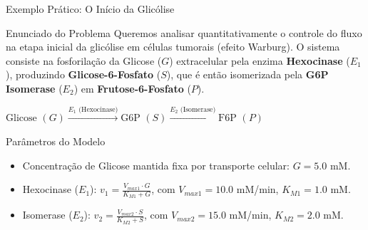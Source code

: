 \begin{frame}[shrink=10]{Exemplo Prático: O Início da Glicólise}
\begin{block}{Enunciado do Problema}
Queremos analisar quantitativamente o controle do fluxo na etapa inicial da glicólise em células tumorais (efeito Warburg). O sistema consiste na fosforilação da Glicose ($G$) extracelular pela enzima \textbf{Hexocinase} ($E_1$), produzindo \textbf{Glicose-6-Fosfato} ($S$), que é então isomerizada pela \textbf{G6P Isomerase} ($E_2$) em \textbf{Frutose-6-Fosfato} ($P$).
\end{block}

\vspace{0.1cm}
\begin{center}
$\text{Glicose } (G) \xrightarrow{E_1 \text{ (Hexocinase)}} \text{G6P } (S) \xrightarrow{E_2 \text{ (Isomerase)}} \text{F6P } (P)$
\end{center}
\vspace{0.1cm}

\begin{block}{Parâmetros do Modelo}
\begin{itemize}
    \item Concentração de Glicose mantida fixa por transporte celular: $G = 5.0$ mM.
    \item Hexocinase ($E_1$): $v_1 = \frac{V_{max1} \cdot G}{K_{M1} + G}$, com $V_{max1} = 10.0$ mM/min, $K_{M1} = 1.0$ mM.
    \item Isomerase ($E_2$): $v_2 = \frac{V_{max2} \cdot S}{K_{M2} + S}$, com $V_{max2} = 15.0$ mM/min, $K_{M2} = 2.0$ mM.
\end{itemize}
\end{block}
\end{frame}

